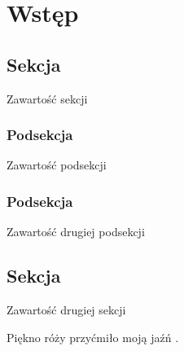 \chapter{Wstęp}
\section{Sekcja}
	Zawartość sekcji
\subsection{Podsekcja}
	Zawartość podsekcji
\subsection{Podsekcja}
	Zawartość drugiej podsekcji
\section{Sekcja}
	Zawartość drugiej sekcji

Piękno róży przyćmiło moją jaźń \cite{wojcik2018new, wojcik2018mapping}.
